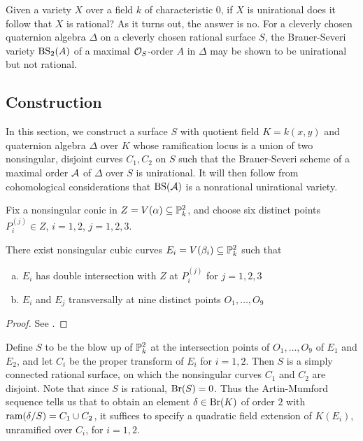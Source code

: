 Given a variety $X$ over a field $k$ of characteristic $0$, if $X$ is unirational does it follow that $X$ is rational?  As it turns out, the answer is no.  For a cleverly chosen quaternion algebra $\Delta$ on a cleverly chosen rational surface $S$, the Brauer-Severi variety $\textnormal{BS}_2(A)$ of a maximal $\mathcal{O}_S$-order $A$ in $\Delta$ may be shown to be unirational but not rational.

\subsection{Construction}
In this section, we construct a surface $S$ with quotient field $K = k(x,y)$ and quaternion algebra $\Delta$ over $K$ whose ramification locus is a union of two nonsingular, disjoint curves $C_1,C_2$ on $S$ such that the Brauer-Severi scheme of a maximal order $\mathcal{A}$ of $\Delta$ over $S$ is unirational.  It will then follow from cohomological considerations that $\textnormal{BS}(\mathcal{A})$ is a nonrational unirational variety.

Fix a nonsingular conic in $Z = V(\alpha)\subseteq \mathbb{P}^2_k$, and choose six distinct points $P_i^{(j)}\in Z$, $i=1,2$, $j=1,2,3$.
\begin{lem}
There exist nonsingular cubic curves $E_i = V(\beta_i) \subseteq \mathbb{P}^2_k$ such that
\begin{enumerate}[(a)]
\item  $E_i$ has double intersection with $Z$ at $P_i^{(j)}$ for $j=1,2,3$
\item  $E_i$ and $E_j$ transversally at nine distinct points $O_1,\dots,O_9$
\end{enumerate}
\end{lem}
\begin{proof}
See \cite{artin1972some}.
\end{proof}

Define $S$ to be the blow up of $\mathbb{P}_k^2$ at the intersection points of $O_1,\dots,O_9$ of $E_1$ and $E_2$, and let $C_i$ be the proper transform of $E_i$ for $i=1,2$.  Then $S$ is a simply connected rational surface, on which the nonsingular curves $C_1$ and $C_2$ are disjoint.  Note that since $S$ is rational, $\textnormal{Br}(S) = 0$.  Thus the Artin-Mumford sequence tells us that to obtain an element $\delta\in\textnormal{Br}(K)$ of order $2$ with $\textnormal{ram}(\delta/S)=C_1\cup C_2$, it suffices to specify a quadratic field extension of $K(E_i)$,  unramified over $C_i$, for $i=1,2$.

